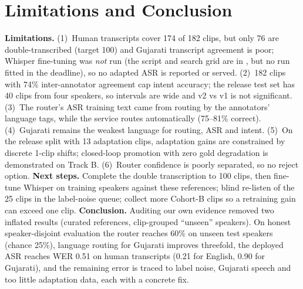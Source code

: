 \documentclass[sigconf,authordraft]{acmart}
\begin{document}
\section{Limitations and Conclusion}\label{sec:concl}
\textbf{Limitations.} (1)~Human transcripts cover 174 of 182 clips, but only 76 are double-transcribed (target 100) and Gujarati transcript agreement is poor; Whisper fine-tuning was \emph{not} run (the script and search grid are in , but no run fitted in the deadline), so no adapted ASR is reported or served. (2)~182 clips with 74\% inter-annotator agreement cap intent accuracy; the release test set has 40 clips from four speakers, so intervals are wide and v2 vs v1 is not significant. (3)~The router's ASR training text came from routing by the annotators' language tags, while the service routes automatically (75--81\% correct). (4)~Gujarati remains the weakest language for routing, ASR and intent. (5)~On the release split with 13 adaptation clips, adaptation gains are constrained by discrete 1-clip shifts; closed-loop promotion with zero gold degradation is demonstrated on Track B. (6)~Router confidence is poorly separated, so no reject option.
\textbf{Next steps.} Complete the double transcription to 100 clips, then fine-tune Whisper on training speakers against these references; blind re-listen of the 25 clips in the label-noise queue; collect more Cohort-B clips so a retraining gain can exceed one clip.
\textbf{Conclusion.} Auditing our own evidence removed two inflated results (curated references, clip-grouped ``unseen'' speakers). On honest speaker-disjoint evaluation the router reaches 60\% on unseen test speakers (chance 25\%), language routing for Gujarati improves threefold, the deployed ASR reaches WER 0.51 on human transcripts (0.21 for English, 0.90 for Gujarati), and the remaining error is traced to label noise, Gujarati speech and too little adaptation data, each with a concrete fix.
\end{document}
